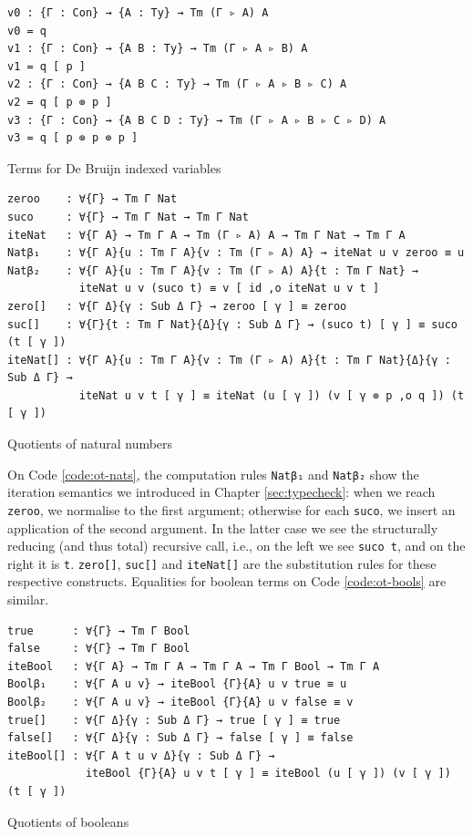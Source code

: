 \begin{listing}[H]
\begin{verbatim}
v0 : {Γ : Con} → {A : Ty} → Tm (Γ ▹ A) A
v0 = q
v1 : {Γ : Con} → {A B : Ty} → Tm (Γ ▹ A ▹ B) A
v1 = q [ p ]
v2 : {Γ : Con} → {A B C : Ty} → Tm (Γ ▹ A ▹ B ▹ C) A
v2 = q [ p ⊚ p ]
v3 : {Γ : Con} → {A B C D : Ty} → Tm (Γ ▹ A ▹ B ▹ C ▹ D) A
v3 = q [ p ⊚ p ⊚ p ]
\end{verbatim}
\caption{Terms for De Bruijn indexed variables}
\label{code:ot-vars}
\end{listing}

\begin{listing}[H]
\begin{verbatim}
zeroo    : ∀{Γ} → Tm Γ Nat
suco     : ∀{Γ} → Tm Γ Nat → Tm Γ Nat
iteNat   : ∀{Γ A} → Tm Γ A → Tm (Γ ▹ A) A → Tm Γ Nat → Tm Γ A
Natβ₁    : ∀{Γ A}{u : Tm Γ A}{v : Tm (Γ ▹ A) A} → iteNat u v zeroo ≡ u
Natβ₂    : ∀{Γ A}{u : Tm Γ A}{v : Tm (Γ ▹ A) A}{t : Tm Γ Nat} →
           iteNat u v (suco t) ≡ v [ id ,o iteNat u v t ]
zero[]   : ∀{Γ Δ}{γ : Sub Δ Γ} → zeroo [ γ ] ≡ zeroo
suc[]    : ∀{Γ}{t : Tm Γ Nat}{Δ}{γ : Sub Δ Γ} → (suco t) [ γ ] ≡ suco (t [ γ ])
iteNat[] : ∀{Γ A}{u : Tm Γ A}{v : Tm (Γ ▹ A) A}{t : Tm Γ Nat}{Δ}{γ : Sub Δ Γ} →
           iteNat u v t [ γ ] ≡ iteNat (u [ γ ]) (v [ γ ⊚ p ,o q ]) (t [ γ ])
\end{verbatim}
\caption{Quotients of natural numbers}
\label{code:ot-nats}
\end{listing}

On Code \ref{code:ot-nats}, the computation rules \verb$Natβ₁$ and \verb$Natβ₂$ show the iteration semantics we introduced in Chapter \ref{sec:typecheck}: when we reach \verb$zeroo$, we normalise to the first argument; otherwise for each \verb$suco$, we insert an application of the second argument. In the latter case we see the structurally reducing (and thus total) recursive call, i.e., on the left we see \verb$suco t$, and on the right it is \verb$t$. \verb$zero[]$, \verb$suc[]$ and \verb$iteNat[]$ are the substitution rules for these respective constructs. Equalities for boolean terms on Code \ref{code:ot-bools} are similar.

\begin{listing}[H]
\begin{verbatim}
true      : ∀{Γ} → Tm Γ Bool
false     : ∀{Γ} → Tm Γ Bool
iteBool   : ∀{Γ A} → Tm Γ A → Tm Γ A → Tm Γ Bool → Tm Γ A
Boolβ₁    : ∀{Γ A u v} → iteBool {Γ}{A} u v true ≡ u
Boolβ₂    : ∀{Γ A u v} → iteBool {Γ}{A} u v false ≡ v
true[]    : ∀{Γ Δ}{γ : Sub Δ Γ} → true [ γ ] ≡ true
false[]   : ∀{Γ Δ}{γ : Sub Δ Γ} → false [ γ ] ≡ false
iteBool[] : ∀{Γ A t u v Δ}{γ : Sub Δ Γ} →
            iteBool {Γ}{A} u v t [ γ ] ≡ iteBool (u [ γ ]) (v [ γ ]) (t [ γ ])
\end{verbatim}
\caption{Quotients of booleans}
\label{code:ot-bools}
\end{listing}

